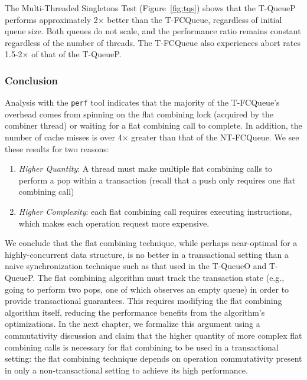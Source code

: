 The Multi-Threaded Singletons Test (Figure~\ref{fig:tqs}) shows that the T-QueueP performs approximately 2$\times$ better than the T-FCQueue, regardless of initial queue size. Both queues do not scale, and the performance ratio remains constant regardless of the number of threads. The T-FCQueue also experiences abort rates 1.5-2$\times$ of that of the T-QueueP.

\vspace{12pt}
\noindent{}

\subsubsection{Conclusion}
Analysis with the \texttt{perf} tool indicates that the majority of the T-FCQueue's overhead comes from spinning on the flat combining lock (acquired by the combiner thread) or waiting for a flat combining call to complete. In addition, the number of cache misses is over 4$\times$ greater than that of the NT-FCQueue. We see these results for two reasons:
\begin{enumerate}
\item \emph{Higher Quantity}: A thread must make multiple flat combining calls to perform a pop within a transaction (recall that a push only requires one flat combining call) 
\item \emph{Higher Complexity}: each flat combining call requires executing instructions, which makes each operation request more expensive.
\end{enumerate}

We conclude that the flat combining technique, while perhaps near-optimal for a highly-concurrent data structure, is no better in a transactional setting than a naive synchronization technique such as that used in the T-QueueO and T-QueueP. The flat combining algorithm must track the transaction state (e.g., going to perform two pops, one of which observes an empty queue) in order to provide transactional guarantees. This requires modifying the flat combining algorithm itself, reducing the performance benefits from the algorithm's optimizations. In the next chapter, we formalize this argument using a commutativity discussion and claim that the higher quantity of more complex flat combining calls is necessary for flat combining to be used in a transactional setting: the flat combining technique depends on operation commutativity present in only a non-transactional setting to achieve its high performance. 

